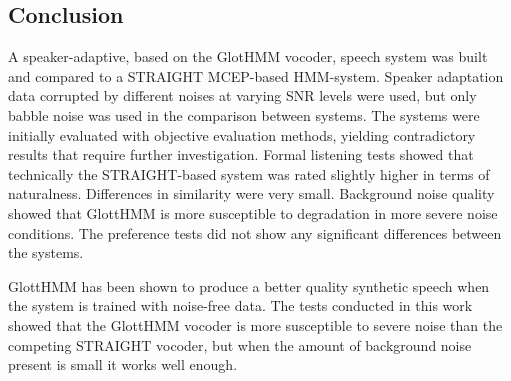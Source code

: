 \subsection{Conclusion}
\label{conclusions_conclusion}
A speaker-adaptive, based on the GlotHMM vocoder, speech system was built and compared to a STRAIGHT MCEP-based HMM-system.
%
Speaker adaptation data corrupted by different noises at varying SNR levels were used, but only babble noise was used in the comparison between systems.
%
The systems were initially evaluated with objective evaluation methods, yielding contradictory results that require further investigation.
%
Formal listening tests showed that technically the STRAIGHT-based system was rated slightly higher in terms of naturalness.
%
Differences in similarity were very small.
%
Background noise quality showed that GlottHMM is more susceptible to degradation in more severe noise conditions.
%
The preference tests did not show any significant differences between the systems.

GlottHMM has been shown to produce a better quality synthetic speech when the system is trained with noise-free data.
%
The tests conducted in this work showed that the GlottHMM vocoder is more susceptible to severe noise than the competing STRAIGHT vocoder, but when the amount of background noise present is small it works well enough.

